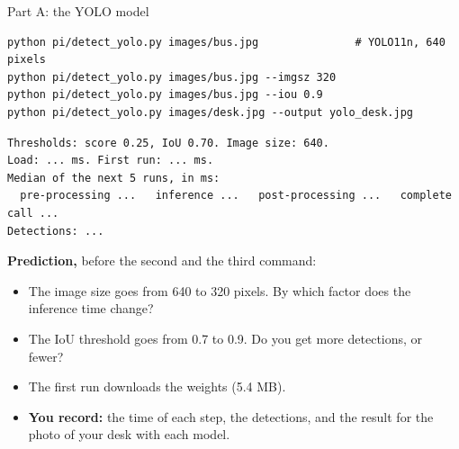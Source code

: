 \begin{frame}[fragile]{Part A: the YOLO model}
  \small
\begin{lstlisting}[style=shell]
python pi/detect_yolo.py images/bus.jpg               # YOLO11n, 640 pixels
python pi/detect_yolo.py images/bus.jpg --imgsz 320
python pi/detect_yolo.py images/bus.jpg --iou 0.9
python pi/detect_yolo.py images/desk.jpg --output yolo_desk.jpg
\end{lstlisting}
\begin{lstlisting}
Thresholds: score 0.25, IoU 0.70. Image size: 640.
Load: ... ms. First run: ... ms.
Median of the next 5 runs, in ms:
  pre-processing ...   inference ...   post-processing ...   complete call ...
Detections: ...
\end{lstlisting}
  \begin{exerciseblock}
    \textbf{Prediction,} before the second and the third command:
    \begin{itemize}
      \item The image size goes from 640 to 320 pixels. By which factor
            does the inference time change?
      \item The IoU threshold goes from 0.7 to 0.9. Do you get more
            detections, or fewer?
    \end{itemize}
  \end{exerciseblock}
  \begin{itemize}
    \item The first run downloads the weights  (5.4 MB).
    \item \textbf{You record:} the time of each step, the detections, and
          the result for the photo of your desk with each model.
  \end{itemize}
\end{frame}

